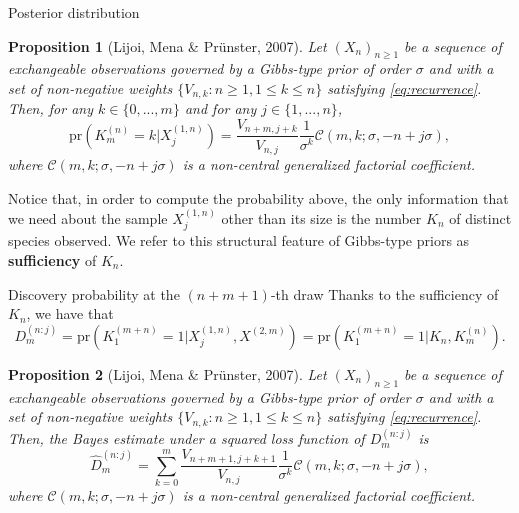 \documentclass[11pt]{beamer}
\newtheorem{proposition}{Proposition}
\begin{document}
\begin{frame}{Posterior distribution}
    \begin{proposition}[Lijoi, Mena \& Pr{\"u}nster, 2007]
        Let \((X_n)_{n \geq 1}\) be a sequence of exchangeable observations governed by a Gibbs-type prior of order \(\sigma\) and with a set of non-negative weights \(\{V_{n, k} \colon n \geq 1, 1 \leq k \leq n\}\) satisfying \eqref{eq:recurrence}. Then, for any \(k \in \{0,...,m\}\) and for any \(j \in \{1,...,n\}\),
        \begin{equation*}
            \text{pr}(K_m^{(n)} = k | X_j^{(1,n)}) = \frac{V_{n+m,j+k}}{V_{n,j}}\frac{1}{\sigma^k} \mathscr{C}(m, k; \sigma, -n + j \sigma),
        \end{equation*}
        where \(\mathscr{C}(m, k; \sigma, -n + j \sigma)\) is a non-central generalized factorial coefficient.
    \end{proposition}
    \medskip
    Notice that, in order to compute the probability above, the only information that we need about the sample \(X_j^{(1,n)}\) other than its size is the number \(K_n\) of distinct species observed. We refer to this structural feature of Gibbs-type priors as \textbf{sufficiency} of \(K_n\).
\end{frame}

\begin{frame}{Discovery probability at the \((n+m+1)\)-th draw}
    Thanks to the sufficiency of \(K_n\), we have that
    \begin{equation*}
        D_m^{(n:j)} = \text{pr}(K_1^{(m + n)} = 1 | X_j^{(1,n)}, X^{(2, m)}) = \text{pr}(K_1^{(m + n)} = 1 | K_n, K^{(n)}_m).
    \end{equation*}
    \begin{proposition}[Lijoi, Mena \& Pr{\"u}nster, 2007]
        Let \((X_n)_{n \geq 1}\) be a sequence of exchangeable observations governed by a Gibbs-type prior of order \(\sigma\) and with a set of non-negative weights \(\{V_{n, k} \colon n \geq 1, 1 \leq k \leq n\}\) satisfying \eqref{eq:recurrence}. Then, the Bayes estimate under a squared loss function of \(D_m^{(n:j)}\) is 
        \begin{equation*}
            \hat{D}_m^{(n:j)} = \sum_{k = 0}^m \frac{V_{n+m+1,j+k+1}}{V_{n,j}}\frac{1}{\sigma^k}\mathscr{C}(m, k; \sigma, -n + j\sigma),
        \end{equation*}
        where \(\mathscr{C}(m, k; \sigma, -n + j \sigma)\) is a non-central generalized factorial coefficient.
    \end{proposition}
\end{frame}
\end{document}
